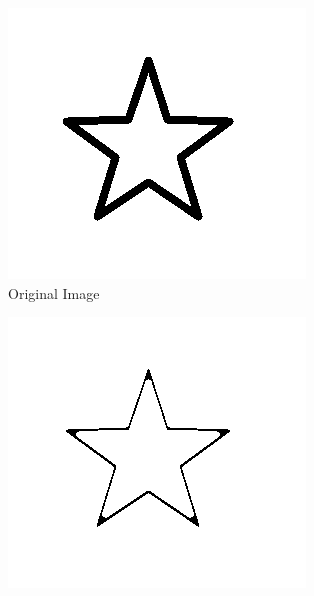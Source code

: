 \begin{figure}[h]
    \centering
    \begin{subfigure}{0.33\textwidth}
        \centering
        \includegraphics[width=.99\linewidth]{images/literature/morphological/star}
        \caption{Original Image}
    \end{subfigure}%
    \begin{subfigure}{.33\textwidth}
        \centering
        \includegraphics[width=.99\linewidth]{images/literature/morphological/dilation}

\end{subfigure}
\end{figure}
